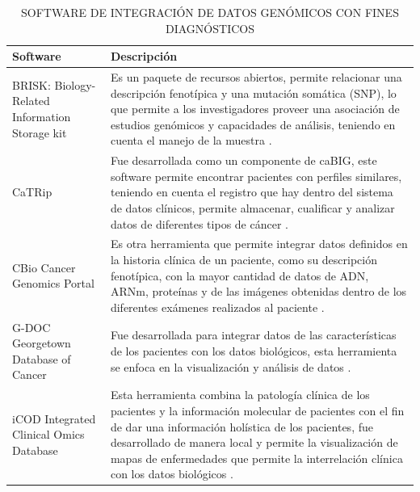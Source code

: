 \begin{table}[]
	\centering
	\caption{SOFTWARE DE INTEGRACIÓN DE DATOS GENÓMICOS CON FINES DIAGNÓSTICOS}
	\label{r}
	\begin{tabular}{|p{5cm}|p{10cm}|}
		\hline
		Software     & Descripción                                                                                                                                                                                                                                                                                                                                                                                 \\ \hline
		BRISK: Biology-Related Information Storage kit      & Es un paquete de recursos abiertos, permite relacionar una descripción fenotípica y una mutación somática (SNP), lo que permite a los investigadores proveer una asociación de estudios genómicos y capacidades de análisis, teniendo en cuenta el manejo de la muestra \cite{Triplet2014}.     \\ \cline{1-2}
		CaTRip       & Fue desarrollada como un componente de caBIG, este software permite encontrar pacientes con perfiles similares, teniendo en cuenta el registro que hay dentro del sistema de datos clínicos, permite almacenar, cualificar y analizar datos de diferentes tipos de cáncer \cite{Canuel2015}.       \\ \cline{1-2}
		CBio Cancer Genomics Portal & Es otra herramienta que permite integrar datos definidos en la historia clínica de un paciente, como su descripción fenotípica, con la mayor cantidad de datos de ADN, ARNm, proteínas y de las imágenes obtenidas dentro de los diferentes exámenes realizados al paciente  \cite{Canuel2015}.                                                                                                                                                                                                              \\ \hline
		G-DOC Georgetown Database of Cancer & Fue desarrollada para integrar datos de las características de los pacientes con los datos biológicos, esta herramienta se enfoca en la visualización y análisis de datos \cite{Canuel2015}.                                                                                                  \\ \cline{1-2}
		iCOD Integrated Clinical Omics Database     & Esta herramienta combina la patología clínica de los pacientes y la información molecular de pacientes con el fin de dar una información holística de los pacientes, fue desarrollado de manera local y permite la visualización de mapas de enfermedades que permite la interrelación clínica con los datos biológicos \cite{Canuel2015}.      \\ \hline
		

\end{tabular}
\end{table}
